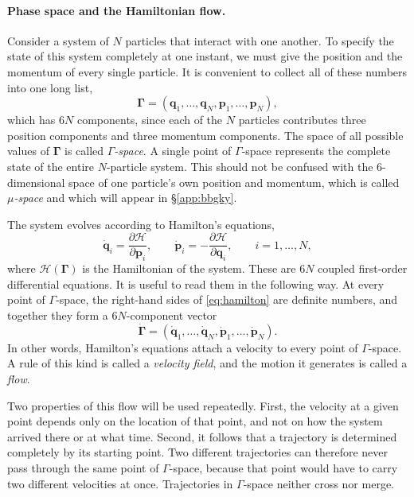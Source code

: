 \documentclass[12pt]{article}
\renewcommand{\vec}[1]{\bm{#1}}
\begin{document}
\paragraph{Phase space and the Hamiltonian flow.}  Consider a system of
$N$ particles that interact with one another.  To specify the state of
this system completely at one instant, we must give the position and
the momentum of every single particle.  It is convenient to collect all
of these numbers into one long list,
%
\begin{equation}
  \vec\Gamma = (\vec q_1,\ldots,\vec q_N,\vec p_1,\ldots,\vec p_N),
  \label{eq:gamma_point}
\end{equation}
%
which has $6N$ components, since each of the $N$ particles contributes
three position components and three momentum components.  The space of
all possible values of $\vec\Gamma$ is called \emph{$\Gamma$-space}.  A
single point of $\Gamma$-space represents the complete state of the
entire $N$-particle system.  This should not be confused with the
$6$-dimensional space of one particle's own position and momentum,
which is called \emph{$\mu$-space} and which will appear in
\S\ref{app:bbgky}.

The system evolves according to Hamilton's equations,
%
\begin{equation}
  \dot{\vec q}_i = \frac{\partial\mathcal H}{\partial\vec p_i},
  \qquad
  \dot{\vec p}_i = -\frac{\partial\mathcal H}{\partial\vec q_i},
  \qquad i = 1,\ldots,N,
  \label{eq:hamilton}
\end{equation}
%
where $\mathcal H(\vec\Gamma)$ is the Hamiltonian of the system.  These
are $6N$ coupled first-order differential equations.  It is useful to
read them in the following way.  At every point of $\Gamma$-space, the
right-hand sides of \eqref{eq:hamilton} are definite numbers, and
together they form a $6N$-component vector
%
\begin{equation}
  \dot{\vec\Gamma} = (\dot{\vec q}_1,\ldots,\dot{\vec q}_N,
                      \dot{\vec p}_1,\ldots,\dot{\vec p}_N).
  \label{eq:gamma_velocity}
\end{equation}
%
In other words, Hamilton's equations attach a velocity to every point
of $\Gamma$-space.  A rule of this kind is called a \emph{velocity
field}, and the motion it generates is called a \emph{flow}.

Two properties of this flow will be used repeatedly.  First, the
velocity at a given point depends only on the location of that point,
and not on how the system arrived there or at what time.  Second, it
follows that a trajectory is determined completely by its starting
point.  Two different trajectories can therefore never pass through the
same point of $\Gamma$-space, because that point would have to carry
two different velocities at once.  Trajectories in $\Gamma$-space
neither cross nor merge.
\end{document}

